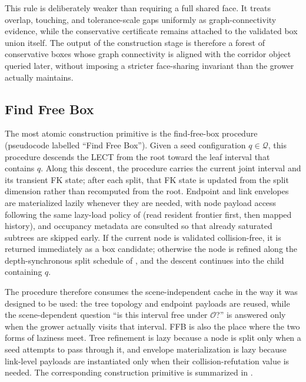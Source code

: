 \documentclass[journal]{IEEEtran}
\newcommand{\calO}{\ensuremath{\mathcal{O}}}
\newcommand{\Q}{\ensuremath{\mathcal{Q}}}
\begin{document}
This rule is deliberately weaker than requiring a full shared face. It treats
overlap, touching, and tolerance-scale gaps uniformly as graph-connectivity
evidence, while the conservative certificate remains attached to the validated
box union itself. The output of the construction stage is therefore a forest of
conservative boxes whose graph connectivity is aligned with the corridor object
queried later, without imposing a stricter face-sharing invariant than the
grower actually maintains.

\subsection{Find Free Box}\label{sec:forest_ffb}

The most atomic construction primitive is the find-free-box procedure (pseudocode
labelled ``Find Free Box''). Given a seed configuration $q\in\Q$, this
procedure descends the LECT from the root toward the leaf interval that
contains $q$. Along this descent, the procedure carries the current joint
interval and its transient FK state; after each split, that FK state is updated
from the split dimension rather than recomputed from the root. Endpoint and
link envelopes are materialized lazily whenever they are needed, with node
payload access following the same lazy-load policy of 
(read resident frontier first, then mapped history), and occupancy
metadata are consulted so that already saturated subtrees are skipped early. If
the current node is validated collision-free, it is returned immediately as a
box candidate; otherwise the node is refined along the depth-synchronous split
schedule of , and the descent continues into the child
containing $q$.

The procedure therefore consumes the scene-independent cache in the way
it was designed to be used: the tree topology and endpoint payloads are reused,
while the scene-dependent question ``is this interval free under $\calO$?'' is
answered only when the grower actually visits that interval. FFB is also the
place where the two forms of laziness meet. Tree refinement is lazy because a
node is split only when a seed attempts to pass through it, and envelope
materialization is lazy because link-level payloads are instantiated only when
their collision-refutation value is needed. The corresponding construction
primitive is summarized in .
\end{document}
